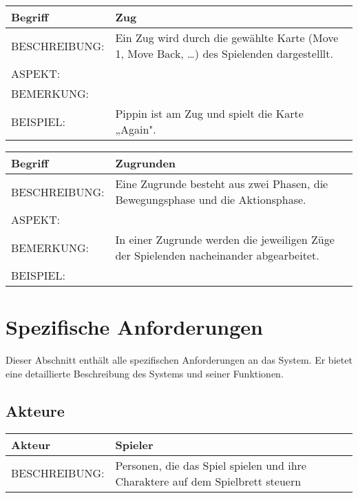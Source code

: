 \documentclass{uulm-assignment}
\begin{document}
	     \begin{tabularx}{\textwidth}{|l|X |} \hline
	        \textbf{Begriff} & \textbf{Zug} \\
	        \hline
	        BESCHREIBUNG: &  Ein Zug wird durch die gewählte Karte (Move 1, Move Back, …) des Spielenden dargestelllt. \\
	        \hline
	        ASPEKT: & 
	        \\
	        \hline
	        BEMERKUNG: &  \\
	        \hline
	        BEISPIEL: & Pippin ist am Zug und spielt die Karte „Again".\\
	        \hline
	    \end{tabularx}

	    \begin{tabularx}{\textwidth}{|l|X |} \hline
	        \textbf{Begriff} & \textbf{Zugrunden } \\
	        \hline
	        BESCHREIBUNG: &  Eine Zugrunde besteht aus zwei Phasen, die Bewegungsphase und die 			Aktionsphase. \\
	        \hline
	        ASPEKT: & 
	        \\
	        \hline
	        BEMERKUNG: & In einer Zugrunde werden die jeweiligen Züge der Spielenden 			nacheinander abgearbeitet. \\
	        \hline
	        BEISPIEL: & \\
	        \hline
	    \end{tabularx}

    
    \section{Spezifische Anforderungen}

    Dieser Abschnitt enthält alle spezifischen Anforderungen an das System. Er bietet eine detaillierte Beschreibung des Systems und seiner Funktionen.
    
    \subsection{Akteure}
    
    \begin{tabularx}{\textwidth}{|l|X |} \hline
	        \textbf{Akteur} & \textbf{Spieler} \\
	        \hline
	        BESCHREIBUNG: &   Personen, die das Spiel spielen und ihre Charaktere auf dem Spielbrett steuern \\
	        \hline
	    \end{tabularx}
\end{document}
